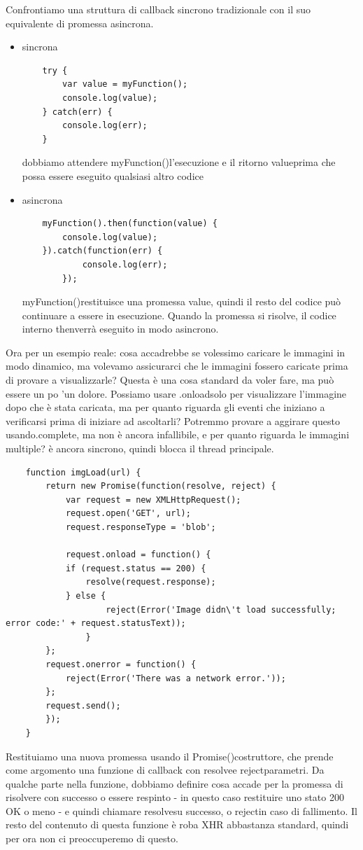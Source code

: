 \documentclass[italian]{article}
\begin{document}
Confrontiamo una struttura di callback sincrono tradizionale con il suo equivalente di promessa asincrona.
\begin{itemize}
\item sincrona 
\begin{lstlisting}
	try {
		var value = myFunction();
		console.log(value);
	} catch(err) {
		console.log(err);
	}
\end{lstlisting}
dobbiamo attendere myFunction()l'esecuzione e il ritorno valueprima che possa essere eseguito qualsiasi altro codice
\item  asincrona
\begin{lstlisting}
	myFunction().then(function(value) {
		console.log(value);
	}).catch(function(err) {
			console.log(err);
		});
\end{lstlisting}
myFunction()restituisce una promessa value, quindi il resto del codice può continuare a essere in esecuzione. Quando la promessa si risolve, il codice interno thenverrà eseguito in modo asincrono. 
\end{itemize}
Ora per un esempio reale: cosa accadrebbe se volessimo caricare le immagini in modo dinamico, ma volevamo assicurarci che le immagini fossero caricate prima di provare a visualizzarle? Questa è una cosa standard da voler fare, ma può essere un po 'un dolore. Possiamo usare .onloadsolo per visualizzare l'immagine dopo che è stata caricata, ma per quanto riguarda gli eventi che iniziano a verificarsi prima di iniziare ad ascoltarli? Potremmo provare a aggirare questo usando.complete, ma non è ancora infallibile, e per quanto riguarda le immagini multiple? è ancora sincrono, quindi blocca il thread principale. 

\begin{lstlisting}
	function imgLoad(url) {
		return new Promise(function(resolve, reject) {      
			var request = new XMLHttpRequest();
			request.open('GET', url);
			request.responseType = 'blob';
			
			request.onload = function() {
			if (request.status == 200) {
				resolve(request.response);
			} else {
					reject(Error('Image didn\'t load successfully; error code:' + request.statusText));
				}
		};	
		request.onerror = function() {
			reject(Error('There was a network error.'));
		};	
		request.send();
		});
	}
\end{lstlisting}
Restituiamo una nuova promessa usando il Promise()costruttore, che prende come argomento una funzione di callback con resolvee rejectparametri. Da qualche parte nella funzione, dobbiamo definire cosa accade per la promessa di risolvere con successo o essere respinto - in questo caso restituire uno stato 200 OK o meno - e quindi chiamare resolvesu successo, o rejectin caso di fallimento. Il resto del contenuto di questa funzione è roba XHR abbastanza standard, quindi per ora non ci preoccuperemo di questo.
\end{document}
